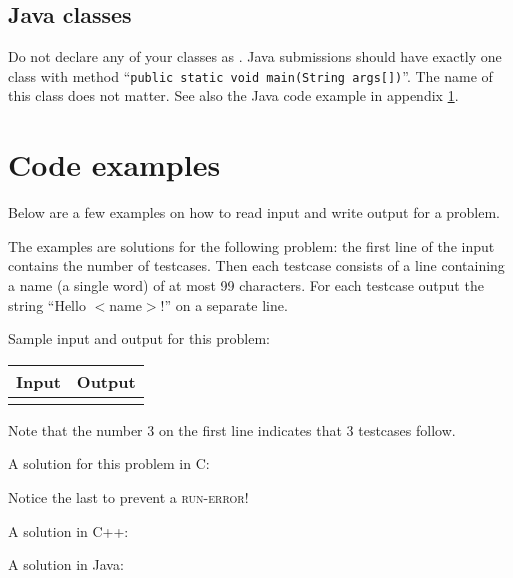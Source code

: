 \subsection{Java classes}

Do not declare any of your classes as .
Java submissions should have exactly one class with method
``\verb!public static void main(String args[])!''.
The name of this class does not matter. See also the Java code example in
appendix \ref{codeexamples}.

\newpage
\appendix

\section{Code examples}\label{codeexamples}

Below are a few examples on how to read input and write output for a
problem.

The examples are solutions for the following problem: the first line
of the input contains the number of testcases. Then each testcase
consists of a line containing a name (a single word) of at most 99
characters. For each testcase output the string ``Hello $<$name$>$!''
on a separate line.

Sample input and output for this problem:

\begin{tabular}{|p{}|p{}|}
\hline
\textbf{Input} & \textbf{Output} \\
\hline
 &
 \\
\hline
\end{tabular}

Note that the number 3 on the first line indicates that 3 testcases
follow.

A solution for this problem in C:

Notice the last  to prevent a \textsc{run-error}!

\newpage

A solution in C++:

A solution in Java:


